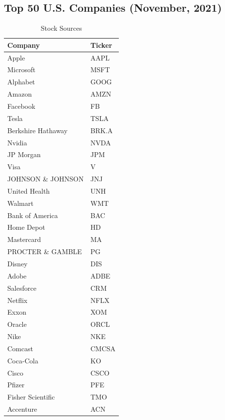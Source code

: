 \documentclass[conference]{IEEEtran}
\begin{document}
\begin{singlespace}



\onecolumn
\begin{Center}
\appendix
\subsection{Top 50 U.S. Companies (November, 2021)}
\label{top50}
\begin{table}[H]
    \caption{Stock Sources}
    \centering
\begin{tabular}{|l|l|}
    \hline
    \textbf{Company} & \textbf{Ticker} \\
    \hline
    Apple & AAPL \\
    Microsoft & MSFT \\
    Alphabet & GOOG \\
    Amazon & AMZN \\
    Facebook & FB \\
    Tesla & TSLA \\
    Berkshire Hathaway & BRK.A \\
    Nvidia & NVDA \\
    JP Morgan & JPM \\
    Visa & V \\
    JOHNSON \& JOHNSON & JNJ \\
    United Health & UNH \\
    Walmart & WMT \\
    Bank of America & BAC \\
    Home Depot & HD \\
    Mastercard & MA \\
    PROCTER \& GAMBLE & PG \\
    Disney & DIS \\
    Adobe & ADBE \\
    Salesforce & CRM \\
    Netflix & NFLX \\
    Exxon & XOM \\
    Oracle & ORCL \\
    Nike & NKE \\
    Comcast & CMCSA \\
    Coca-Cola & KO \\
    Cisco & CSCO \\
    Pfizer & PFE \\
    Fisher Scientific & TMO \\
    Accenture & ACN \\

\end{tabular}
\end{table}
\end{Center}
\end{singlespace}
\end{document}
